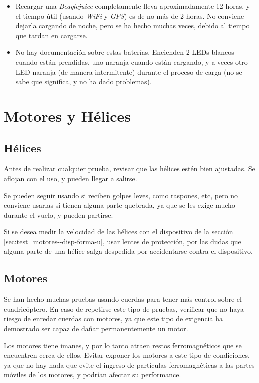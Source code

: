 \documentclass[main]{subfiles}
\begin{document}
\begin{itemize}
\item Recargar una \textit{Beaglejuice} completamente lleva aproximadamente 12 horas, y el tiempo útil (usando \textit{WiFi} y \textit{GPS}) es de no más de 2 horas. No conviene dejarla cargando de noche, pero se ha hecho muchas veces, debido al tiempo que tardan en cargarse.
\item No hay documentación sobre estas baterías. Encienden 2 LEDs blancos cuando están prendidas, uno naranja cuando están cargando, y a veces otro LED naranja (de manera intermitente) durante el proceso de carga (no se sabe que significa, y no ha dado problemas).
\end{itemize}

\section{Motores y Hélices}
\label{sec:hardware-cuidados--motores-y-helices}

\subsection{Hélices}
\label{sec:hardware-cuidados--helices}

Antes de realizar cualquier prueba, revisar que las hélices estén bien ajustadas. Se aflojan con el uso, y pueden llegar a salirse.

Se pueden seguir usando si reciben golpes leves, como raspones, etc, pero no conviene usarlas si tienen alguna parte quebrada, ya que se les exige mucho durante el vuelo, y pueden partirse.

Si se desea medir la velocidad de las hélices con el dispositivo de la sección \ref{sec:test_motores--disp-forma-u}, usar lentes de protección, por las dudas que alguna parte de una hélice salga despedida por accidentarse contra el dispositivo.

\subsection{Motores}
\label{sec:hardware-cuidados--helices}

Se han hecho muchas pruebas usando cuerdas para tener más control sobre el cuadricóptero. En caso de repetirse este tipo de pruebas, verificar que no haya riesgo de enredar cuerdas con motores, ya que este tipo de exigencia ha demostrado ser capaz de dañar permanentemente un motor.

Los motores tiene imanes, y por lo tanto atraen restos ferromagnéticos que se encuentren cerca de ellos. Evitar exponer los motores a este tipo de condiciones, ya que no hay nada que evite el ingreso de partículas ferromagnéticas a las partes móviles de los motores, y podrían afectar su performance.
\end{document}
